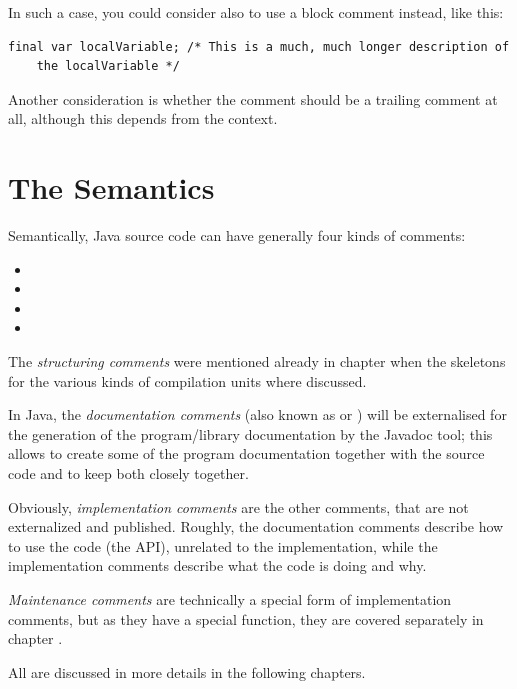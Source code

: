 In such a case, you could consider also to use a block comment instead, like this:
\begin{lstlisting}
final var localVariable; /* This is a much, much longer description of 
    the localVariable */
\end{lstlisting}

Another consideration is whether the comment should be a trailing comment at all, although this depends from the context.


\section{The Semantics}
Semantically, Java source code can have generally four kinds of comments:
\begin{itemize}[nosep]
	\item{}
	\item{}
	\item{}
	\item{}
\end{itemize}

The \textit{structuring comments} were mentioned already in chapter  when the skeletons for the various kinds of compilation units where discussed.

In Java, the \textit{documentation comments} (also known as  or ) will be externalised for the generation of the program/library documentation by the Javadoc tool; this allows to create some of the program documentation together with the source code and to keep both closely together. 

Obviously, \textit{implementation comments} are the other comments, that are not externalized and published. Roughly, the documentation comments describe how to use the code (the API), unrelated to the implementation, while the implementation comments describe what the code is doing and why.

\textit{Maintenance comments} are technically a special form of implementation comments, but as they have a special function, they are covered separately in chapter .

All are discussed in more details in the following chapters.
  

